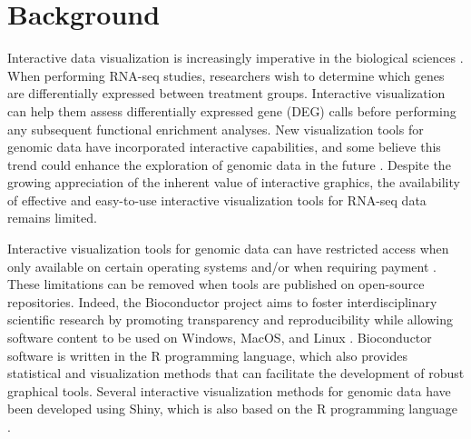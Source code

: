 \documentclass[parskip=full]{bmcart} %
\begin{document}




\section*{Background}

Interactive data visualization is increasingly imperative in the biological sciences \cite{o2010visualizing}. When performing RNA-seq studies, researchers wish to determine which genes are differentially expressed between treatment groups. Interactive visualization can help them assess differentially expressed gene (DEG) calls before performing any subsequent functional enrichment analyses. New visualization tools for genomic data have incorporated interactive capabilities, and some believe this trend could enhance the exploration of genomic data in the future \cite{pavlopoulos2015visualizing}. Despite the growing appreciation of the inherent value of interactive graphics, the availability of effective and easy-to-use interactive visualization tools for RNA-seq data remains limited.

Interactive visualization tools for genomic data can have restricted access when only available on certain operating systems and/or when requiring payment \cite{seo2002interactively, ahlberg1996spotfire, chu2001genespringtm}. These limitations can be removed when tools are published on open-source repositories. Indeed, the Bioconductor project aims to foster interdisciplinary scientific research by promoting transparency and reproducibility while allowing software content to be used on Windows, MacOS, and Linux \cite{gentleman2004bioconductor}. Bioconductor software is written in the R programming language, which also provides statistical and visualization methods that can facilitate the development of robust graphical tools. Several interactive visualization methods for genomic data have been developed using Shiny, which is also based on the R programming language \cite{rue2018isee, schultheis2018wilson, hughes2017expressiondb}. 
\end{document}
